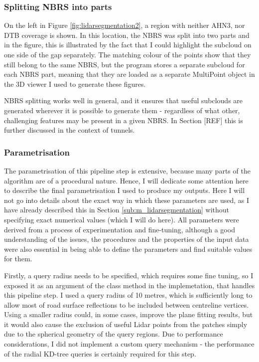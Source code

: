 \subsubsection{Splitting NBRS into parts}

On the left in Figure \ref{fig:lidarsegmentation2}, a region with neither AHN3, nor DTB coverage is shown. In this location, the NBRS was split into two parts and in the figure, this is illustrated by the fact that I could highlight the subcloud on one side of the gap separately. The matching colour of the points show that they still belong to the same NBRS, but the program stores a separate subcloud for each NBRS part, meaning that they are loaded as a separate MultiPoint object in the 3D viewer I used to generate these figures.

NBRS splitting works well in general, and it ensures that useful subclouds are generated wherever it is possible to generate them - regardless of what other, challenging features may be present in a given NBRS. In Section [REF] this is further discussed in the context of tunnels.

\subsubsection{Parametrisation}

The parametrisation of this pipeline step is extensive, because many parts of the algorithm are of a procedural nature. Hence, I will dedicate some attention here to describe the final parametrisation I used to produce my outputs. Here I will not go into details about the exact way in which these parameters are used, as I have already described this in Section \ref{sub:m_lidarsegmentation} without specifying exact numerical values (which I will do here). All parameters were derived from a process of experimentation and fine-tuning, although a good understanding of the issues, the procedures and the properties of the input data were also essential in being able to define the parameters and find suitable values for them.

Firstly, a query radius needs to be specified, which requires some fine tuning, so I exposed it as an argument of the class method in the implemetation, that handles this pipeline step. I used a query radius of 10 metres, which is sufficiently long to allow most of road surface reflections to be included between centreline vertices. Using a smaller radius could, in some cases, improve the plane fitting results, but it would also cause the exclusion of useful Lidar points from the patches simply due to the spherical geometry of the query regions. Due to performance considerations, I did not implement a custom query mechanism - the performance of the radial KD-tree queries is certainly required for this step.

